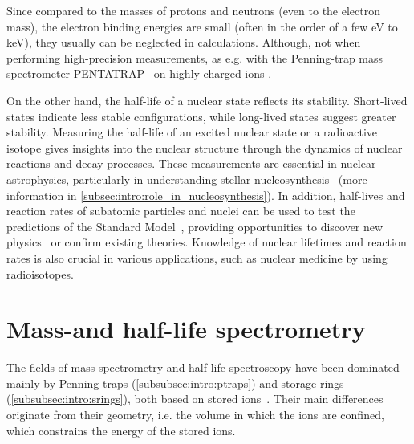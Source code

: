 Since compared to the masses of protons and neutrons (even to the electron mass), the electron binding energies are small (often in the order of a few eV to keV), they usually can be neglected in calculations. Although, not when performing high-precision measurements, as e.g. with the Penning-trap mass spectrometer \textsc{PENTATRAP}~\cite{Repp2012} on highly charged ions \cite{PhysRevLett.124.113001}.
\newpar

On the other hand, the half-life of a nuclear state reflects its stability. Short-lived states indicate less stable configurations, while long-lived states suggest greater stability. Measuring the half-life of an excited nuclear state or a radioactive isotope gives insights into the nuclear structure through the dynamics of nuclear reactions and decay processes.
\newpar
These measurements are essential in nuclear astrophysics, particularly in understanding stellar nucleosynthesis~\cite{rolfs1988cauldrons} (more information in \cref{subsec:intro:role_in_nucleosynthesis}). In addition, half-lives and reaction rates of subatomic particles and nuclei can be used to test the predictions of the Standard Model~\cite{standardmodel}, providing opportunities to discover new physics~\cite{TheStandardModelAndBeyond} or confirm existing theories.
Knowledge of nuclear lifetimes and reaction rates is also crucial in various applications, such as nuclear medicine by using radioisotopes.


\section{Mass-and half-life spectrometry}\label{sec:mass_and_halflife_spectro}
The fields of mass spectrometry and half-life spectroscopy have been dominated mainly by Penning traps (\cref{subsubsec:intro:ptraps}) and storage rings (\cref{subsubsec:intro:srings}), both based on stored ions~\cite{BLAUM20061}. Their main differences originate from their geometry, i.e. the volume in which the ions are confined, which constrains the energy of the stored ions. 

